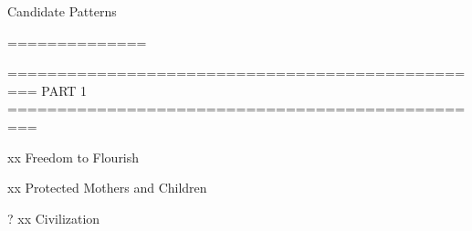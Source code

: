 
Candidate Patterns

==============

=================================================
 PART 1
=================================================

	xx  Freedom to Flourish   %
		
	xx  Protected Mothers and Children   %

?   xx  Civilization   %
		
